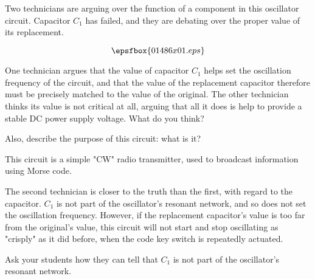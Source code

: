 

Two technicians are arguing over the function of a component in this oscillator circuit.  Capacitor $C_1$ has failed, and they are debating over the proper value of its replacement.

$$\epsfbox{01486x01.eps}$$

One technician argues that the value of capacitor $C_1$ helps set the oscillation frequency of the circuit, and that the value of the replacement capacitor therefore must be precisely matched to the value of the original.  The other technician thinks its value is not critical at all, arguing that all it does is help to provide a stable DC power supply voltage.  What do you think?

\vskip 10pt

Also, describe the purpose of this circuit: what is it?







This circuit is a simple "CW" radio transmitter, used to broadcast information using Morse code.

The second technician is closer to the truth than the first, with regard to the capacitor.  $C_1$ is not part of the oscillator's resonant network, and so does not set the oscillation frequency.  However, if the replacement capacitor's value is too far from the original's value, this circuit will not start and stop oscillating as "crisply" as it did before, when the code key switch is repeatedly actuated.







Ask your students how they can tell that $C_1$ is not part of the oscillator's resonant network.





